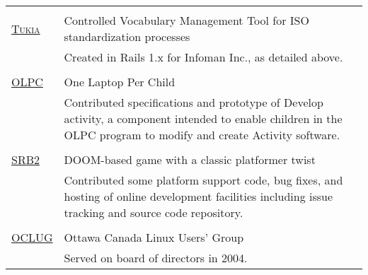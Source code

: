 \documentclass[letterpaper,10pt]{article}
\begin{document}
\begin{longtable}{p{3cm}|p{12cm}}
  \multicolumn{2}{c}{} \\
  \textsc{\href{https://github.com/orospakr/tukia}{Tukia}} & Controlled Vocabulary Management Tool for ISO standardization processes \\
   & \footnotesize{Created in Rails 1.x for Infoman Inc., as detailed above.} \\
  \multicolumn{2}{c}{} \\
  \textsc{\href{http://www.laptop.org}{OLPC}} & One Laptop Per Child \\
   & \footnotesize{Contributed specifications and prototype of Develop activity, a component intended to enable children in the OLPC program to modify and create Activity software.} \\
  \multicolumn{2}{c}{} \\
  \textsc{\href{http://www.srb2.org}{SRB2}} & DOOM-based game with a classic platformer twist \\
   & \footnotesize{Contributed some platform support code, bug fixes, and hosting of online development facilities including issue tracking and source code repository.} \\
  \multicolumn{2}{c}{} \\
  \textsc{\href{http://www.oclug.on.ca}{OCLUG}} & Ottawa Canada Linux Users' Group \\
   & \footnotesize{Served on board of directors in 2004.}
\end{longtable}
\end{document}
